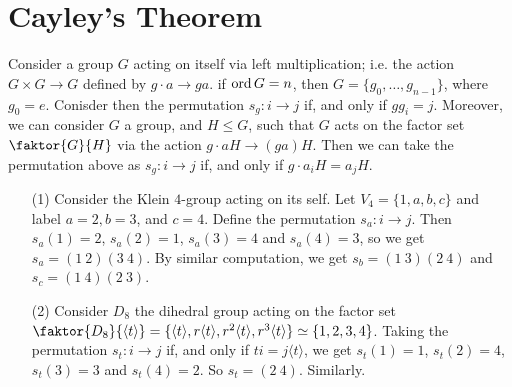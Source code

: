 \section{Cayley's Theorem}
\label{section_4.2}

Consider a group $G$ acting on itself via left multiplication; i.e. the action
$G \times G \xrightarrow{} G$ defined by $g \cdot a \xrightarrow{} ga$. if
$\operatorname{ord}{G}=n$, then $G=\{g_0, \dots, g_{n-1}\}$, where $g_0=e$. Conisder then the
permutation $s_g:i \xrightarrow{} j$ if, and only if $gg_i=j$. Moreover, we can
consider $G$ a group, and  $H \leq G$, such that $G$ acts on the factor set
$\faktor{G}{H}$ via the action $g \cdot aH \xrightarrow{} (ga)H$. Then we can
take the permutation above as $s_g:i \xrightarrow{} j$ if, and only if $g \cdot
a_iH=a_jH$.

\begin{example}\label{examle_4.5}
  \begin{enumerate}
    \item[(1)] Consider the Klein $4$-group acting on its self. Let
      $V_4=\{1, a,b,c\}$ and label $a=2,b=3$, and  $c=4$. Define the
      permutation $s_a:i \xrightarrow{} j$. Then $s_a(1)=2$, $s_a(2)=1$,
      $s_a(3)=4$ and $s_a(4)=3$, so we get $s_a=(1 \ 2)(3 \ 4)$. By
      similar computation, we get $s_b=(1 \ 3)(2 \ 4)$ and $s_c=(1 \ 4)(2
      \ 3)$.

    \item[(2)] Consider $D_8$ the dihedral group acting on the factor set
      $\faktor{D_8}{\langle t \rangle}=\{\langle t \rangle, r \langle t
      \rangle, r^2 \langle t \rangle, r^3 \langle t \rangle\} \simeq
      \{1,2,3,4\}$. Taking the permutation $s_t:i \xrightarrow{} j$ if,
      and only if $ti=j\langle t \rangle$, we get $s_t(1)=1$, $s_t(2)=4$,
      $s_t(3)=3$ and $s_t(4)=2$. So $s_t=(2 \ 4)$. Similarly.
  \end{enumerate}
\end{example}

